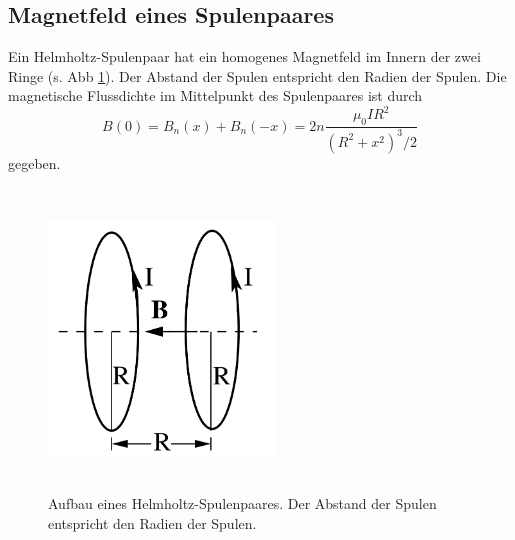 \subsection{Magnetfeld eines Spulenpaares}
Ein Helmholtz-Spulenpaar hat ein homogenes Magnetfeld im Innern der zwei Ringe %
(s. Abb \ref{fig:helmholtz}). Der Abstand der Spulen entspricht den Radien der
Spulen.
Die magnetische Flussdichte im Mittelpunkt des Spulenpaares ist durch 
\begin{equation}
B(0)= B_{n}(x) + B_{n}(-x) = 2n \frac{\mu_{0} I R^2}{(R^2 + x^2)^3/2} %
\end{equation}
gegeben.
\begin{figure}
    \centering
    \includegraphics[width=6cm,height=8cm]{build/Helmholtz.png}
    \caption{Aufbau eines Helmholtz-Spulenpaares. Der Abstand der Spulen
    entspricht den Radien der Spulen.}
    \label{fig:helmholtz}
\end{figure}

